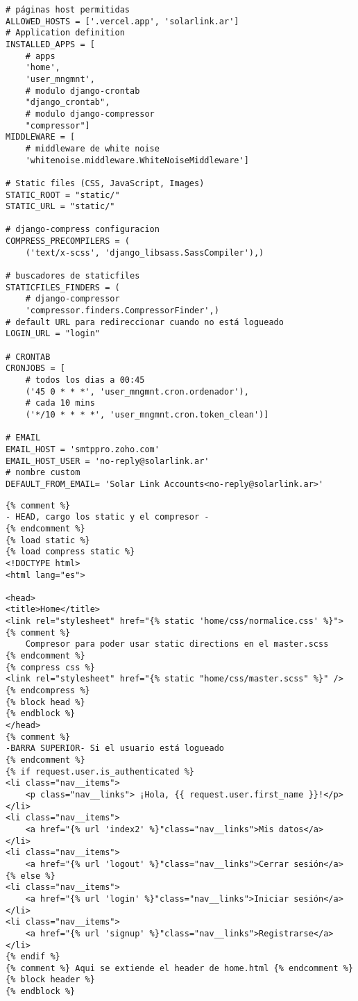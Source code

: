 \begin{listing}[H]
\begin{verbatim}
# páginas host permitidas
ALLOWED_HOSTS = ['.vercel.app', 'solarlink.ar']
# Application definition
INSTALLED_APPS = [
    # apps
    'home',
    'user_mngmnt',
    # modulo django-crontab
    "django_crontab",
    # modulo django-compressor
    "compressor"]
MIDDLEWARE = [
    # middleware de white noise
    'whitenoise.middleware.WhiteNoiseMiddleware']
    
# Static files (CSS, JavaScript, Images)
STATIC_ROOT = "static/"
STATIC_URL = "static/"

# django-compress configuracion
COMPRESS_PRECOMPILERS = (
    ('text/x-scss', 'django_libsass.SassCompiler'),)
    
# buscadores de staticfiles
STATICFILES_FINDERS = (
    # django-compressor
    'compressor.finders.CompressorFinder',)
# default URL para redireccionar cuando no está logueado
LOGIN_URL = "login"

# CRONTAB
CRONJOBS = [
    # todos los dias a 00:45
    ('45 0 * * *', 'user_mngmnt.cron.ordenador'),
    # cada 10 mins
    ('*/10 * * * *', 'user_mngmnt.cron.token_clean')]
    
# EMAIL
EMAIL_HOST = 'smtppro.zoho.com'
EMAIL_HOST_USER = 'no-reply@solarlink.ar'
# nombre custom
DEFAULT_FROM_EMAIL= 'Solar Link Accounts<no-reply@solarlink.ar>'
\end{verbatim}
\caption{Configuraciones especiales para el proyecto en el settings.py}
\label{settings.py}
\end{listing}

\begin{listing}[H]
\begin{verbatim}
{% comment %}
- HEAD, cargo los static y el compresor -
{% endcomment %}
{% load static %}
{% load compress static %}
<!DOCTYPE html>
<html lang="es">

<head>
<title>Home</title>
<link rel="stylesheet" href="{% static 'home/css/normalice.css' %}">
{% comment %}
    Compresor para poder usar static directions en el master.scss
{% endcomment %}
{% compress css %}
<link rel="stylesheet" href="{% static "home/css/master.scss" %}" />
{% endcompress %}
{% block head %}
{% endblock %}
</head>
{% comment %}
-BARRA SUPERIOR- Si el usuario está logueado
{% endcomment %}
{% if request.user.is_authenticated %}
<li class="nav__items">
    <p class="nav__links"> ¡Hola, {{ request.user.first_name }}!</p>
</li>
<li class="nav__items">
    <a href="{% url 'index2' %}"class="nav__links">Mis datos</a>
</li>
<li class="nav__items">
    <a href="{% url 'logout' %}"class="nav__links">Cerrar sesión</a>
{% else %}
<li class="nav__items">
    <a href="{% url 'login' %}"class="nav__links">Iniciar sesión</a>
</li>
<li class="nav__items">
    <a href="{% url 'signup' %}"class="nav__links">Registrarse</a>
</li>
{% endif %}
{% comment %} Aqui se extiende el header de home.html {% endcomment %}
{% block header %}
{% endblock %}
\end{verbatim}
\caption{Secciones head y barra superior del home.html}
\label{home.html}
\end{listing}

